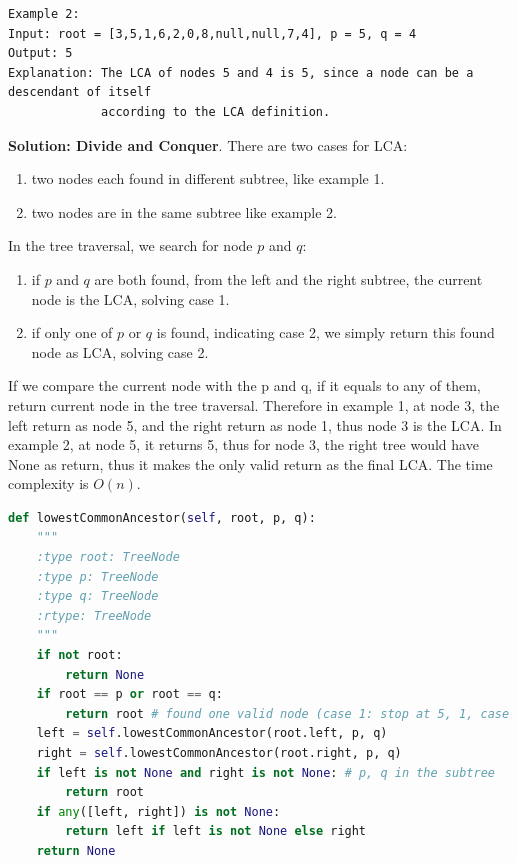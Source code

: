 \documentclass[../main.tex]{subfiles}
\begin{document}
\begin{examples}[resume]
\begin{lstlisting}[numbers=none]
Example 2:
Input: root = [3,5,1,6,2,0,8,null,null,7,4], p = 5, q = 4
Output: 5
Explanation: The LCA of nodes 5 and 4 is 5, since a node can be a descendant of itself
             according to the LCA definition.
\end{lstlisting}
\textbf{Solution: Divide and Conquer}. There are two cases for LCA: 
\begin{enumerate}
    \item  two nodes each found in different subtree, like example 1. \item two nodes are in the same subtree like example 2.
\end{enumerate}
In the tree traversal, we search for node $p$ and $q$:
\begin{enumerate}
    \item if $p$ and $q$ are both found, from the left and the right subtree, the current node is the LCA, solving case 1.
    \item if only one of $p$ or $q$ is found, indicating case 2, we simply return this found node as LCA, solving case 2.
\end{enumerate}
If we compare the current node with the p and q, if it equals to any of them, return current node in the tree traversal. Therefore in example 1, at node 3, the left return as node 5, and the right return as node 1, thus node 3 is the LCA. In example 2, at node 5, it returns 5, thus for node 3, the right tree would have None as return, thus it makes the only valid return as the final LCA. The time complexity is $O(n)$.
\begin{lstlisting}[language=Python]
def lowestCommonAncestor(self, root, p, q):
    """
    :type root: TreeNode
    :type p: TreeNode
    :type q: TreeNode
    :rtype: TreeNode
    """
    if not root:
        return None
    if root == p or root == q:
        return root # found one valid node (case 1: stop at 5, 1, case 2:stop at 5)
    left = self.lowestCommonAncestor(root.left, p, q)
    right = self.lowestCommonAncestor(root.right, p, q)
    if left is not None and right is not None: # p, q in the subtree
        return root 
    if any([left, right]) is not None:
        return left if left is not None else right
    return None
\end{lstlisting}
\end{examples}
\end{document}
